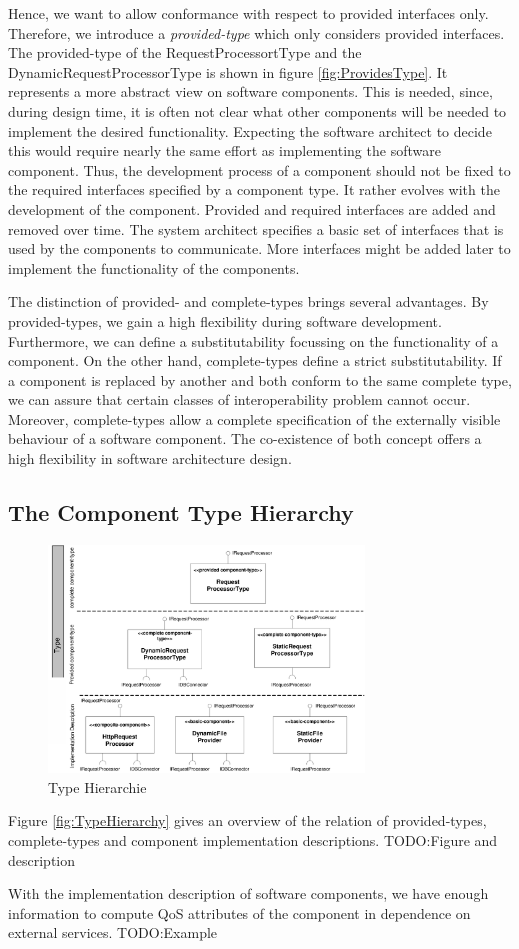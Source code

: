 Hence, we want to allow conformance with respect to provided interfaces only.
Therefore, we introduce a \emph{provided-type} which only considers provided
interfaces. The provided-type of the RequestProcessortType and the
DynamicRequestProcessorType is shown in figure \ref{fig:ProvidesType}. 
It represents a more abstract view on software components. This is needed,
since, during design time, it is often not clear what other components will be
needed to implement the desired functionality. Expecting the software architect
to decide this would require nearly the same effort as implementing the software
component. Thus, the development process of a component should not be fixed to
the required interfaces specified by a component type. It rather evolves with
the development of the component. Provided and required interfaces are added and
removed over time. The system architect specifies a basic set of interfaces that
is used by the components to communicate. More interfaces might be added later
to implement the functionality of the components.


The distinction of provided- and complete-types brings several advantages. By
provided-types, we gain a high flexibility during software development.
Furthermore, we can define a substitutability focussing on the functionality of
a component. On the other hand, complete-types define a strict substitutability.
If a component is replaced by another and both conform to the same complete
type, we can assure that certain classes of interoperability problem cannot
occur. Moreover, complete-types allow a complete specification of the externally
visible behaviour of a software component. The co-existence of both concept
offers a high flexibility in software architecture design.

\subsection{The Component Type Hierarchy}

\begin{figure}[htbp]
\centering
\includegraphics[width=3.3in]{example/TypeHierachy}
\caption{Type Hierarchie}
\label{fig:WebserverComponents}
\end{figure}

Figure \ref{fig:TypeHierarchy} gives an overview of the relation of
provided-types, complete-types and component implementation descriptions.
TODO:Figure and description

With the implementation description of software components, we have enough
information to compute QoS attributes of the component in dependence on external
services.
TODO:Example

